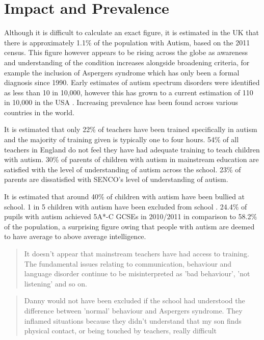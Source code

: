 \documentclass[11pt]{report}
\begin{document}
\section{Impact and Prevalence}
Although it is difficult to calculate an exact figure, it is estimated in the UK that there is approximately 1.1\% of the 
population with Autism, based on the 2011 census\cite{nas}. This figure however appears to be rising across the globe as awareness and understanding of the condition increases alongside broadening criteria\cite{increasingprevalence}, for example the inclusion of Aspergers syndrome which has only been a formal diagnosis since 1990. Early estimates of autism spectrum disorders were identified as less than 10 in 10,000, however this has grown to a current estimation of 110 in 10,000 in the USA \cite{increasingprevalence}. Increasing prevalence has been found across various countries in the world.

It is estimated that only 22\% of teachers have been trained specifically in autism and the majority of training given is typically one to four hours. 54\% of all teachers in England do not feel they have had adequate training to teach children with autism.\cite{statsandfacts} 30\% of parents of children with autism in mainstream education are satisfied with the level of understanding of autism across the school\cite{nasschool}. 23\% of parents are dissatisfied with SENCO's level of understanding of autism. 

It is estimated that around 40\% of children with autism have been bullied at school. 1 in 5 children with autism have been excluded from school \cite{nasschool}. 24.4\% of pupils with autism achieved 5A*-C GCSEs in 2010/2011 in comparison to 58.2\% of the population\cite{statsandfacts}, a surprising figure owing that people with autism are deemed to have average to above average intelligence\cite{findreference}.

\begin{quote}
It doesn't appear that mainstream teachers have had access to training. The fundamental issues relating to communication, behaviour and language disorder continue to be misinterpreted as 'bad behaviour', 'not listening' and so on.\cite{nasschool}
\end{quote}

\begin{quote}
Danny would not have been excluded if the school had understood the difference between 'normal' behaviour and Aspergers syndrome. They inflamed situations because they didn't understand that my son finds physical contact, or being touched by teachers, really difficult \cite{nasschool}
\end{quote}
\end{document}
